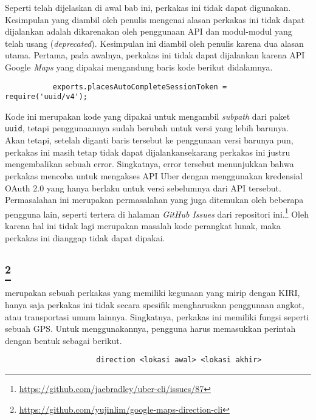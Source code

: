 Seperti telah dijelaskan di awal bab ini, perkakas ini tidak dapat digunakan. Kesimpulan yang diambil oleh penulis mengenai alasan perkakas ini tidak dapat dijalankan adalah dikarenakan oleh penggunaan API dan modul-modul yang telah usang (\textit{deprecated}). Kesimpulan ini diambil oleh penulis karena dua alasan utama. Pertama, pada awalnya, perkakas ini tidak dapat dijalankan karena API Google \textit{Maps} yang dipakai mengandung baris kode berikut didalamnya.

\begin{verbatim}
           exports.placesAutoCompleteSessionToken = require('uuid/v4');
\end{verbatim}

Kode ini merupakan kode yang dipakai untuk mengambil \textit{subpath} dari paket \verb|uuid|, tetapi penggunaannya sudah berubah untuk versi yang lebih barunya. Akan tetapi, setelah diganti baris tersebut ke penggunaan versi barunya pun, perkakas ini masih tetap tidak dapat dijalankan\textemdash sekarang perkakas ini justru mengembalikan sebuah error. Singkatnya, error tersebut menunjukkan bahwa perkakas mencoba untuk mengakses API Uber dengan menggunakan kredensial OAuth 2.0 yang hanya berlaku untuk versi sebelumnya dari API tersebut. Permasalahan ini merupakan permasalahan yang juga ditemukan oleh beberapa pengguna lain, seperti tertera di halaman \textit{GitHub Issues} dari repositori ini.\footnote{\href{https://github.com/jaebradley/uber-cli/issues/87}{https://github.com/jaebradley/uber-cli/issues/87}} Oleh karena hal ini tidak lagi merupakan masalah kode perangkat lunak, maka perkakas ini dianggap tidak dapat dipakai.

\subsection{\googlemapscli\footnote{\href{https://github.com/yujinlim/google-maps-direction-cli}{https://github.com/yujinlim/google-maps-direction-cli}}}
\label{sec:similarapps-googlemapscli}

\googlemapscli merupakan sebuah perkakas \cl yang memiliki kegunaan yang mirip dengan KIRI, hanya saja perkakas ini tidak secara spesifik mengharuskan penggunaan angkot, atau transportasi umum lainnya. Singkatnya, perkakas ini memiliki fungsi seperti sebuah GPS. Untuk menggunakannya, pengguna harus memasukkan perintah dengan bentuk sebagai berikut.

\begin{verbatim}
                     direction <lokasi awal> <lokasi akhir>
\end{verbatim}


